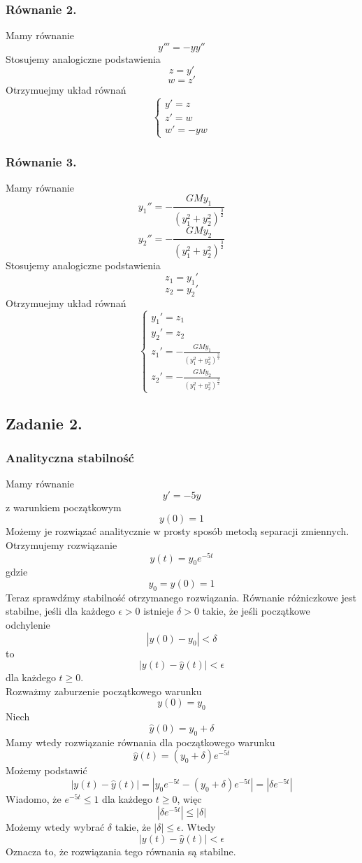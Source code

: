 \documentclass[11pt, leqno]{scrartcl}
\begin{document}
    \subsubsection{Równanie 2.}
    Mamy równanie
    \[
        y'''=-yy''
    \]
    Stosujemy analogiczne podstawienia
    \[
        z=y'
    \]
    \[
        w=z'
    \]
    Otrzymuejmy układ równań
    \[
        \begin{cases}
            y'=z \\
            z'=w \\
            w'=-yw
        \end{cases}
    \]

    \subsubsection{Równanie 3.}
    Mamy równanie
    \[
        y_1''=-\frac{GMy_1}{(y_1^2+y_2^2)^{\frac{3}{2}}}
    \]
    \[
        y_2''=-\frac{GMy_2}{(y_1^2+y_2^2)^{\frac{3}{2}}}
    \]
    Stosujemy analogiczne podstawienia
    \[
        z_1=y_1'
    \]
    \[
        z_2=y_2'
    \]
    Otrzymuejmy układ równań
    \[
        \begin{cases}
            y_1'=z_1 \\
            y_2'=z_2 \\
            z_1'=-\frac{GMy_1}{(y_1^2+y_2^2)^{\frac{3}{2}}} \\
            z_2'=-\frac{GMy_2}{(y_1^2+y_2^2)^{\frac{3}{2}}}
        \end{cases}
    \]

    \subsection{Zadanie 2.}
    \subsubsection{Analityczna stabilność}
    Mamy równanie
    \[
        y'=-5y
    \]
    z warunkiem początkowym
    \[
        y(0)=1
    \]
    Możemy je rozwiązać analitycznie w prosty sposób metodą
    separacji zmiennych. Otrzymujemy rozwiązanie
    \[
        y(t)=y_0e^{-5t}
    \]
    gdzie
    \[
        y_0=y(0)=1
    \]
    Teraz sprawdźmy stabilność otrzymanego rozwiązania.
    Równanie różniczkowe jest stabilne, jeśli dla każdego
    $\epsilon > 0$ istnieje $\delta > 0$ takie, że jeśli
    początkowe odchylenie
    \[
        |y(0)-y_0|<\delta
    \]
    to
    \[
        |y(t)-\hat{y}(t)|<\epsilon
    \]
    dla każdego $t \geq 0$. \\ 
    Rozważmy zaburzenie początkowego warunku
    \[
        y(0)=y_0
    \]
    Niech
    \[
        \hat{y}(0)=y_0+\delta
    \]
    Mamy wtedy rozwiązanie równania dla początkowego warunku
    \[
        \hat{y}(t)=(y_0+\delta)e^{-5t}
    \]
    Możemy podstawić
    \[
        |y(t)-\hat{y}(t)|=|y_0e^{-5t}-(y_0+\delta)e^{-5t}|=
            |\delta e^{-5t}|
    \]
    Wiadomo, że $e^{-5t} \leq 1$ dla każdego $t \geq 0$, więc
    \[
        |\delta e^{-5t}| \leq |\delta|
    \]
    Możemy wtedy wybrać $\delta$ takie, że
    $|\delta | \leq \epsilon $. Wtedy
    \[
        |y(t)-\hat{y}(t)| < \epsilon
    \]
    Oznacza to, że rozwiązania tego równania są stabilne.
\end{document}
